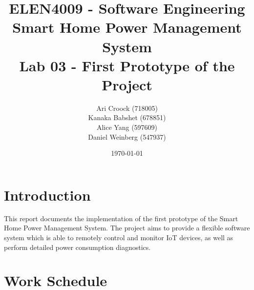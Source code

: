 \documentclass[11pt, a4paper]{article}
\title{ELEN4009 - Software Engineering\\Smart Home Power Management System\\Lab 03 - First Prototype of the Project}
\author{Ari Croock (718005)\\Kanaka Babshet (678851)\\Alice Yang (597609)\\Daniel Weinberg (547937)}
\date{\today}
\begin{document}
	\maketitle
	\section{Introduction}
	This report documents the implementation of the first prototype of the Smart Home Power Management System. 
	\newline
	\newline	
	\noindent
	The project aims to provide a flexible software system which is able to remotely control and monitor IoT devices, as well as perform detailed power consumption diagnostics.
		

	\section{Work Schedule}
	
\end{document}
